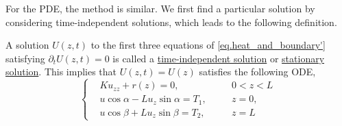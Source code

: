 For the PDE, the method is similar. We first find a particular solution by considering time-independent solutions, which leads to the following definition.


\begin{definition}
    A solution $U(z, t)$ to the first three equations of \eqref{eq.heat_and_boundary'} satisfying $\partial_t U(z, t)=0$ is called a \underline{time-independent solution} or \underline{stationary solution}. This implies that $U(z, t)=U(z)$ satisfies the following ODE,
    \begin{equation}\label{eq.time_independent_sol}
        \left\{\begin{aligned} 
            &K u_{z z} + r(z) = 0, && 0<z<L
            \\ 
            &u \cos \alpha-L u_z \sin \alpha=T_1,\quad && z=0, 
            \\ 
            &u \cos \beta+L u_z \sin \beta=T_2, && z=L
        \end{aligned}\right.
    \end{equation}
\end{definition}

